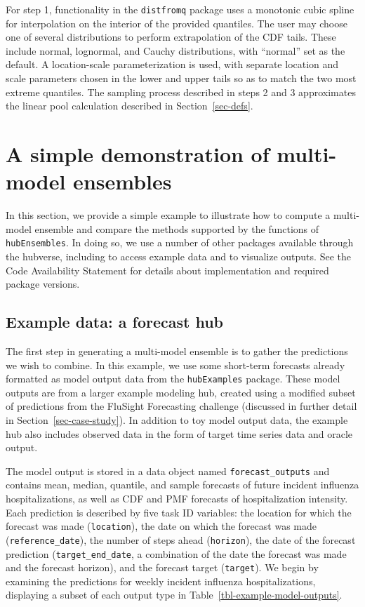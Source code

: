 \documentclass[
]{article}
\begin{document}
For step 1, functionality in the \texttt{distfromq} package uses a
monotonic cubic spline for interpolation on the interior of the provided
quantiles. The user may choose one of several distributions to perform
extrapolation of the CDF tails. These include normal, lognormal, and
Cauchy distributions, with ``normal'' set as the default. A
location-scale parameterization is used, with separate location and
scale parameters chosen in the lower and upper tails so as to match the
two most extreme quantiles. The sampling process described in steps 2
and 3 approximates the linear pool calculation described in
Section~\ref{sec-defs}.

\section{A simple demonstration of multi-model
ensembles}\label{sec-simple-ex}

In this section, we provide a simple example to illustrate how to
compute a multi-model ensemble and compare the methods supported by the
functions of \texttt{hubEnsembles}. In doing so, we use a number of
other packages available through the hubverse, including to access
example data and to visualize outputs. See the Code Availability
Statement for details about implementation and required package
versions.

\subsection{Example data: a forecast
hub}\label{example-data-a-forecast-hub}

The first step in generating a multi-model ensemble is to gather the
predictions we wish to combine. In this example, we use some short-term
forecasts already formatted as model output data from the
\texttt{hubExamples} package. These model outputs are from a larger
example modeling hub, created using a modified subset of predictions
from the FluSight Forecasting challenge (discussed in further detail in
Section~\ref{sec-case-study}). In addition to toy model output data, the
example hub also includes observed data in the form of target time
series data and oracle output.

The model output is stored in a data object named
\texttt{forecast\_outputs} and contains mean, median, quantile, and
sample forecasts of future incident influenza hospitalizations, as well
as CDF and PMF forecasts of hospitalization intensity. Each prediction
is described by five task ID variables: the location for which the
forecast was made (\texttt{location}), the date on which the forecast
was made (\texttt{reference\_date}), the number of steps ahead
(\texttt{horizon}), the date of the forecast prediction
(\texttt{target\_end\_date}, a combination of the date the forecast was
made and the forecast horizon), and the forecast target
(\texttt{target}). We begin by examining the predictions for weekly
incident influenza hospitalizations, displaying a subset of each output
type in Table~\ref{tbl-example-model-outputs}.
\end{document}
